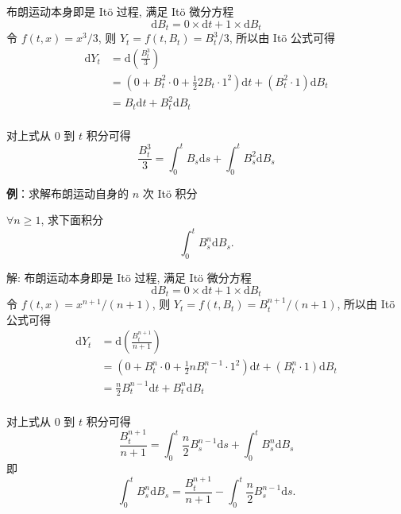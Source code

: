\documentclass[openany]{ctexbook}
\theoremstyle{kaiti}
\theoremstyle{normal}
\begin{document}
布朗运动本身即是 It\"o 过程, 满足 It\"o 微分方程 
\begin{equation}
  \mathrm{d}B_t=0\times\mathrm{d}t+1\times\mathrm{d}B_t
\end{equation} 
令 $f(t,x)=x^3/3$, 则 $Y_t=f(t,B_t)=B_t^3/3$, 所以由 It\"o 公式可得
\begin{equation}
  \begin{aligned}
  \mathrm{d}Y_t&=\mathrm{d}\left(\frac{B_t^3}{3}\right)\\
  &=\left(0+B_t^2\cdot0+\frac{1}{2}2B_t\cdot1^2\right)\mathrm{d}t+(B_t^2\cdot1)\mathrm{d}B_t\\
  &=B_t\mathrm{d}t+B_t^2\mathrm{d}B_t\\
  \end{aligned}
\end{equation}

对上式从 $0$ 到 $t$ 积分可得
\begin{equation}
  \frac{B_t^3}{3}=\int_0^tB_s\mathrm{d}s+\int_0^tB_s^2\mathrm{d}B_s
\end{equation}

\textbf{例}：求解布朗运动自身的 $n$ 次 It\"o 积分

$\forall n\geqslant1$, 求下面积分
\begin{equation}
  \int_0^tB_s^n\mathrm{d}B_s.
\end{equation}

解: 布朗运动本身即是 It\"o 过程, 满足 It\"o 微分方程 
\begin{equation}
  \mathrm{d}B_t=0\times\mathrm{d}t+1\times\mathrm{d}B_t
\end{equation} 
令 $f(t,x)=x^{n+1}/(n+1)$, 则 $Y_t=f(t,B_t)=B_t^{n+1}/(n+1)$, 所以由 It\"o 公式可得 
\begin{equation}
  \begin{aligned}
  \mathrm{d}Y_t&=\mathrm{d}\left(\frac{B_t^{n+1}}{n+1}\right)\\
  &=\left(0+B_t^n\cdot0+\frac{1}{2}nB_t^{n-1}\cdot1^2\right)\mathrm{d}t+(B_t^n\cdot1)\mathrm{d}B_t\\
  &=\frac{n}{2}B_t^{n-1}\mathrm{d}t+B_t^n\mathrm{d}B_t\\
  \end{aligned}
\end{equation}

对上式从 $0$ 到 $t$ 积分可得
\begin{equation}
  \frac{B_t^{n+1}}{n+1}=\int_0^t\frac{n}{2}B_s^{n-1}\mathrm{d}s+\int_0^tB_s^n\mathrm{d}B_s
\end{equation}
即
\begin{equation}
  \int_0^tB_s^n\mathrm{d}B_s=\frac{B_t^{n+1}}{n+1}-\int_0^t\frac{n}{2}B_s^{n-1}\mathrm{d}s.
\end{equation}
\end{document}
